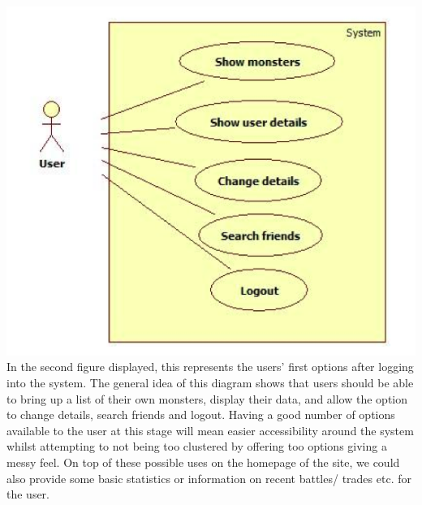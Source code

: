 \documentclass[a4paper]{article}
\begin{document}
\begin{center}
\includegraphics[width=\textwidth]{img/UseCaseLScreen.jpg}
In the second figure displayed, this represents the users’ first options after logging into the system. The general idea of this diagram shows that users should be able to bring up a list of their own monsters, display their data, and allow the option to change details, search friends and logout. Having a good number of options available to the user at this stage will mean easier accessibility around the system whilst attempting to not being too clustered by offering too options giving a messy feel. On top of these possible uses on the homepage of the site, we could also provide some basic statistics or information on recent battles/ trades etc. for the user.


\end{center}
\end{document}
